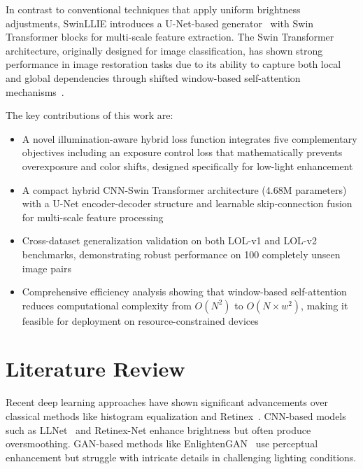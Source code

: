 \documentclass[conference]{IEEEtran}
\begin{document}
In contrast to conventional techniques that apply uniform brightness adjustments, SwinLLIE introduces a U-Net-based generator~\cite{ronneberger2015unet} with Swin Transformer blocks for multi-scale feature extraction. The Swin Transformer architecture, originally designed for image classification, has shown strong performance in image restoration tasks due to its ability to capture both local and global dependencies through shifted window-based self-attention mechanisms~\cite{liu2021swin, liang2021swinir}.

The key contributions of this work are:
\begin{itemize}
    \item A novel illumination-aware hybrid loss function integrates five complementary objectives including an exposure control loss that mathematically prevents overexposure and color shifts,  designed specifically for low-light enhancement
    \item A compact hybrid CNN-Swin Transformer architecture (4.68M parameters) with a U-Net encoder-decoder structure and learnable skip-connection fusion for multi-scale feature processing
    \item Cross-dataset generalization validation on both LOL-v1 and LOL-v2 benchmarks, demonstrating robust performance on 100 completely unseen image pairs
    \item Comprehensive efficiency analysis showing that window-based self-attention reduces computational complexity from $O(N^2)$ to $O(N \times w^2)$, making it feasible for deployment on resource-constrained devices
\end{itemize}

\section{Literature Review}

Recent deep learning approaches have shown significant advancements over classical methods like histogram equalization and Retinex~\cite{land1977retinex}. CNN-based models such as LLNet~\cite{lore2017llnet} and Retinex-Net enhance brightness but often produce oversmoothing. GAN-based methods like EnlightenGAN~\cite{jiang2021enlightengan} use perceptual enhancement but struggle with intricate details in challenging lighting conditions.
\end{document}
